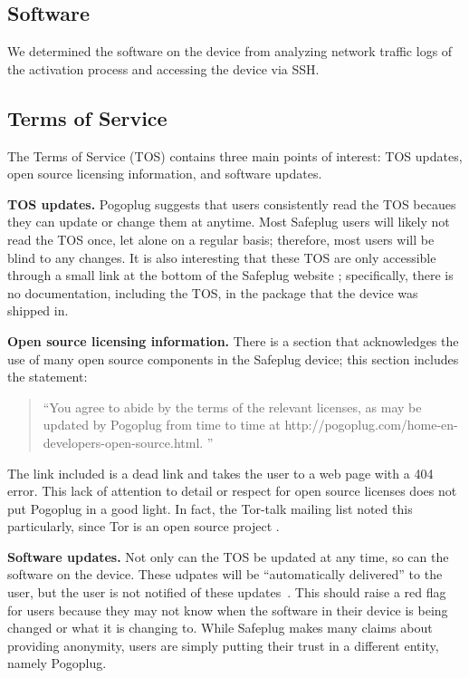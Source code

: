 \documentclass[conference]{IEEEtran}
\begin{document}
\subsection{Software}
\label{software}
We determined the software on the device from analyzing network traffic logs of the activation process and accessing the device via SSH.

\subsection{Terms of Service}
\label{tos}
The Terms of Service (TOS) contains three main points of interest: TOS updates, open source licensing information, and software updates.

{\bf TOS updates.} Pogoplug suggests that users consistently read the TOS becaues they can update or change them at anytime.  Most Safeplug users will likely not read the TOS once, let alone on a regular basis; therefore, most users will be blind to any changes.  It is also interesting that these TOS are only accessible through a small link at the bottom of the Safeplug website \cite{safeplug}; specifically, there is no documentation, including the TOS, in the package that the device was shipped in.

{\bf Open source licensing information.}  There is a section that acknowledges the use of many open source components in the Safeplug device; this section includes the statement: 

\begin{quotation}
``You agree to abide by the terms of the relevant licenses, as may be updated by Pogoplug from time to time at http://pogoplug.com/home-en-developers-open-source.html. '' \cite{safeplug}
\end{quotation}

The link included is a dead link and takes the user to a web page with a 404 error.  This lack of attention to detail or respect for open source licenses does not put Pogoplug in a good light.  In fact, the Tor-talk mailing list noted this particularly, since Tor is an open source project \cite{tormailinglist}.

{\bf Software updates.} Not only can the TOS be updated at any time, so can the software on the device.  These udpates will be ``automatically delivered'' to the user, but the user is not notified of these updates~\cite{safeplug}.  This should raise a red flag for users because they may not know when the software in their device is being changed or what it is changing to.  While Safeplug makes many claims about providing anonymity, users are simply putting their trust in a different entity, namely Pogoplug.
\end{document}
